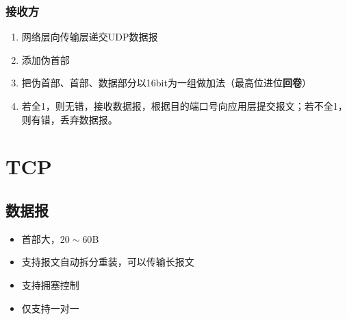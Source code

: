 \subsubsection{接收方}
\begin{enumerate}
    \item 网络层向传输层递交UDP数据报
    \item 添加伪首部
    \item 把伪首部、首部、数据部分以16bit为一组做加法（最高位进位\textbf{回卷}）
    \item 若全1，则无错，接收数据报，根据目的端口号向应用层提交报文；若不全1，则有错，丢弃数据报。
\end{enumerate}


\section{TCP}

\subsection{数据报}
\begin{itemize}
    \item 首部大，\(20\sim60\)B
    \item 支持报文自动拆分重装，可以传输长报文
    \item 支持拥塞控制
    \item 仅支持一对一
\end{itemize}














































































